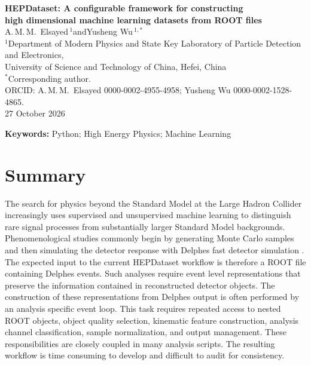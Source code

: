\documentclass[11pt,a4paper]{article}
\begin{document}
\begin{center}
  {\LARGE\bfseries HEPDataset: A configurable framework for constructing\\[0.25em]
   high dimensional machine learning datasets from ROOT files}\\[1.4em]

  {\large A.\,M.\,M.~Elsayed\,$^{1}$\quad and\quad Yusheng Wu\,$^{1,\ast}$}\\[0.9em]

  {\small
   $^{1}$Department of Modern Physics and State Key Laboratory of Particle Detection
   and Electronics,\\
   University of Science and Technology of China, Hefei, China}\\[0.6em]

  {\footnotesize
   $^{\ast}$Corresponding author.\\
   ORCID: A.\,M.\,M.~Elsayed 0000-0002-4955-4958;
   Yusheng Wu 0000-0002-1528-4865.}\\[0.6em]

  {\small 27 October 2026}
\end{center}

\vspace{0.6em}
\begin{center}
  {\small\textbf{Keywords:} Python; High Energy Physics; Machine Learning}
\end{center}
\vspace{0.6em}

\section{Summary}

The search for physics beyond the Standard Model at the Large Hadron Collider
increasingly uses supervised and unsupervised machine learning to distinguish
rare signal processes from substantially larger Standard Model backgrounds.
Phenomenological studies commonly begin by generating Monte Carlo samples and
then simulating the detector response with Delphes fast detector
simulation \citep{delphes}. The expected input to the current HEPDataset
workflow is therefore a ROOT file containing Delphes events. Such
analyses require event level representations that preserve the information
contained in reconstructed detector objects. The construction of these
representations from Delphes output is often performed by an analysis
specific event loop. This task requires repeated access to nested ROOT objects,
object quality selection, kinematic feature construction, analysis channel
classification, sample normalization, and output management. These
responsibilities are closely coupled in many analysis scripts. The resulting
workflow is time consuming to develop and difficult to audit for consistency.
\end{document}
